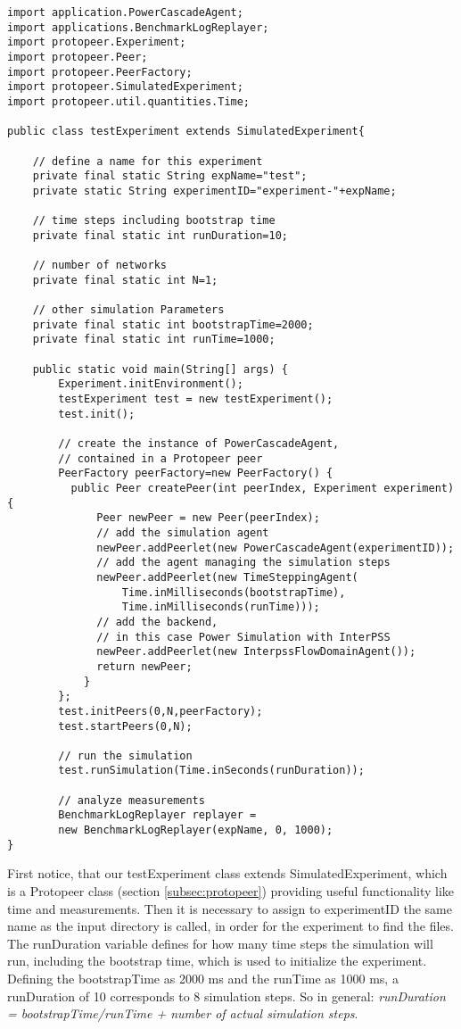 \documentclass[11pt,fleqn]{book} %
\begin{document}
	\begin{lstlisting}[frame=single] 
import application.PowerCascadeAgent;
import applications.BenchmarkLogReplayer;
import protopeer.Experiment;
import protopeer.Peer;
import protopeer.PeerFactory;
import protopeer.SimulatedExperiment;
import protopeer.util.quantities.Time;

public class testExperiment extends SimulatedExperiment{    

    // define a name for this experiment
    private final static String expName="test";    
    private static String experimentID="experiment-"+expName;
    
    // time steps including bootstrap time
    private final static int runDuration=10;

    // number of networks
    private final static int N=1;
	    
    // other simulation Parameters
    private final static int bootstrapTime=2000;
    private final static int runTime=1000;
    
    public static void main(String[] args) {
        Experiment.initEnvironment();
        testExperiment test = new testExperiment();
        test.init();
        
        // create the instance of PowerCascadeAgent, 
        // contained in a Protopeer peer
        PeerFactory peerFactory=new PeerFactory() {
          public Peer createPeer(int peerIndex, Experiment experiment){
              Peer newPeer = new Peer(peerIndex);
              // add the simulation agent
              newPeer.addPeerlet(new PowerCascadeAgent(experimentID));
              // add the agent managing the simulation steps
              newPeer.addPeerlet(new TimeSteppingAgent(
                  Time.inMilliseconds(bootstrapTime),
                  Time.inMilliseconds(runTime)));
              // add the backend, 
              // in this case Power Simulation with InterPSS
              newPeer.addPeerlet(new InterpssFlowDomainAgent());
              return newPeer;
            }
        };
        test.initPeers(0,N,peerFactory);
        test.startPeers(0,N);

        // run the simulation
        test.runSimulation(Time.inSeconds(runDuration));

        // analyze measurements
        BenchmarkLogReplayer replayer =
        new BenchmarkLogReplayer(expName, 0, 1000);
}
	\end{lstlisting}
First notice, that our testExperiment class extends SimulatedExperiment, which is a Protopeer class (section \ref{subsec:protopeer}) providing useful functionality like time and measurements. Then it is necessary to assign to experimentID the same name as the input directory is called, in order for the experiment to find the files. The runDuration variable defines for how many time steps the simulation will run, including the bootstrap time, which is used to initialize the experiment. Defining the bootstrapTime as 2000 ms and the runTime as 1000 ms, a runDuration of 10 corresponds to 8 simulation steps. So in general: \textit{runDuration = bootstrapTime/runTime + number of actual simulation steps}. 
\end{document}
